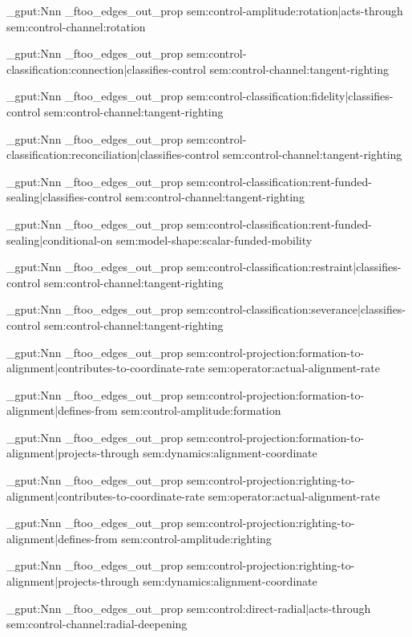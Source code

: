 \prop_gput:Nnn \g_ftoo_edges_out_prop { sem:control-amplitude:rotation|acts-through } { sem:control-channel:rotation }

\prop_gput:Nnn \g_ftoo_edges_out_prop { sem:control-classification:connection|classifies-control } { sem:control-channel:tangent-righting }

\prop_gput:Nnn \g_ftoo_edges_out_prop { sem:control-classification:fidelity|classifies-control } { sem:control-channel:tangent-righting }

\prop_gput:Nnn \g_ftoo_edges_out_prop { sem:control-classification:reconciliation|classifies-control } { sem:control-channel:tangent-righting }

\prop_gput:Nnn \g_ftoo_edges_out_prop { sem:control-classification:rent-funded-sealing|classifies-control } { sem:control-channel:tangent-righting }

\prop_gput:Nnn \g_ftoo_edges_out_prop { sem:control-classification:rent-funded-sealing|conditional-on } { sem:model-shape:scalar-funded-mobility }

\prop_gput:Nnn \g_ftoo_edges_out_prop { sem:control-classification:restraint|classifies-control } { sem:control-channel:tangent-righting }

\prop_gput:Nnn \g_ftoo_edges_out_prop { sem:control-classification:severance|classifies-control } { sem:control-channel:tangent-righting }

\prop_gput:Nnn \g_ftoo_edges_out_prop { sem:control-projection:formation-to-alignment|contributes-to-coordinate-rate } { sem:operator:actual-alignment-rate }

\prop_gput:Nnn \g_ftoo_edges_out_prop { sem:control-projection:formation-to-alignment|defines-from } { sem:control-amplitude:formation }

\prop_gput:Nnn \g_ftoo_edges_out_prop { sem:control-projection:formation-to-alignment|projects-through } { sem:dynamics:alignment-coordinate }

\prop_gput:Nnn \g_ftoo_edges_out_prop { sem:control-projection:righting-to-alignment|contributes-to-coordinate-rate } { sem:operator:actual-alignment-rate }

\prop_gput:Nnn \g_ftoo_edges_out_prop { sem:control-projection:righting-to-alignment|defines-from } { sem:control-amplitude:righting }

\prop_gput:Nnn \g_ftoo_edges_out_prop { sem:control-projection:righting-to-alignment|projects-through } { sem:dynamics:alignment-coordinate }

\prop_gput:Nnn \g_ftoo_edges_out_prop { sem:control:direct-radial|acts-through } { sem:control-channel:radial-deepening }

